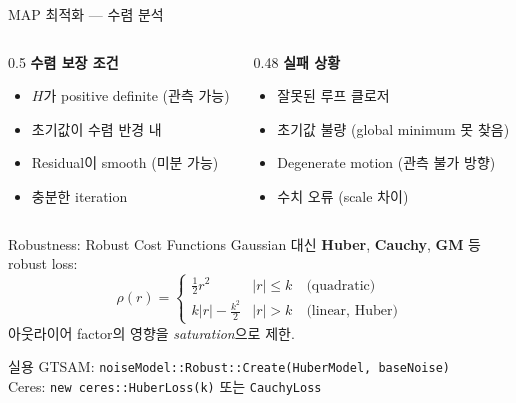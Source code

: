 \begin{frame}[shrink=20]{MAP 최적화 — 수렴 분석}
  \begin{columns}[T]
    \begin{column}{0.5\textwidth}
      \textbf{수렴 보장 조건}
      \begin{itemize}
        \item $H$가 positive definite (관측 가능)
        \item 초기값이 수렴 반경 내
        \item Residual이 smooth (미분 가능)
        \item 충분한 iteration
      \end{itemize}
    \end{column}
    \begin{column}{0.48\textwidth}
      \textbf{실패 상황}
      \begin{itemize}
        \item 잘못된 루프 클로저
        \item 초기값 불량 (global minimum 못 찾음)
        \item Degenerate motion (관측 불가 방향)
        \item 수치 오류 (scale 차이)
      \end{itemize}
    \end{column}
  \end{columns}
  \pause
  \vspace{0.5em}
  \begin{block}{Robustness: Robust Cost Functions}
    Gaussian 대신 \textbf{Huber}, \textbf{Cauchy}, \textbf{GM} 등 robust loss:
    \[
      \rho(r) = \begin{cases}
        \frac{1}{2}r^2 & |r| \le k \quad \text{(quadratic)} \\
        k|r| - \frac{k^2}{2} & |r| > k \quad \text{(linear, Huber)}
      \end{cases}
    \]
    아웃라이어 factor의 영향을 \emph{saturation}으로 제한.
  \end{block}
  \pause
  \begin{exampleblock}{실용}
    GTSAM: \texttt{noiseModel::Robust::Create(HuberModel, baseNoise)}\\
    Ceres: \texttt{new ceres::HuberLoss(k)} 또는 \texttt{CauchyLoss}
  \end{exampleblock}
\end{frame}

